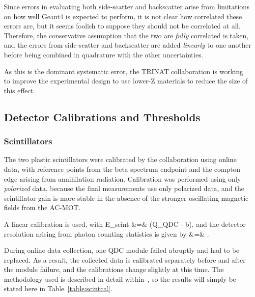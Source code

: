 Since errors in evaluating both side-scatter and backscatter arise from limitations on how well Geant4 is expected to perform, it is not clear how correlated these errors are, but it seems foolish to suppose they should not be correlated at all.  Therefore, the conservative assumption that the two are \emph{fully} correlated is taken, and the errors from side-scatter and backscatter are added \emph{linearly} to one another before being combined in quadrature with the other uncertainties.  

As this is the dominant systematic error, the TRINAT collaboration is working to improve the experimental design to use lower-Z materials to reduce the size of this effect.




\subsection{Detector Calibrations and Thresholds}
\subsubsection{Scintillators}
The two plastic scintillators were calibrated by the collaboration using online data, with reference points from the beta spectrum endpoint and the compton edge arising from annihilation radiation.  Calibration was performed using only \emph{polarized} data, because the final measurements use only polarized data, and the scintillator gain is more stable in the absence of the stronger oscillating magnetic fields from the AC-MOT.  

A linear calibration is used, with
\bea
E_{\textrm{scint}} &=& (Q_{\textrm{QDC}} - b), 
\eea
and the detector resolution arising from photon counting statistics is given by
\bea
\sigma &=& .
\eea

During online data collection, one QDC module failed abruptly and had to be replaced.  As a result, the collected data is calibrated separately before and after the module failure, and the calibrations change slightly at this time. The methodology used is described in detail within~\cite{ben_thesis}, so the results will simply be stated here in Table~\ref{table:scintcal}.


